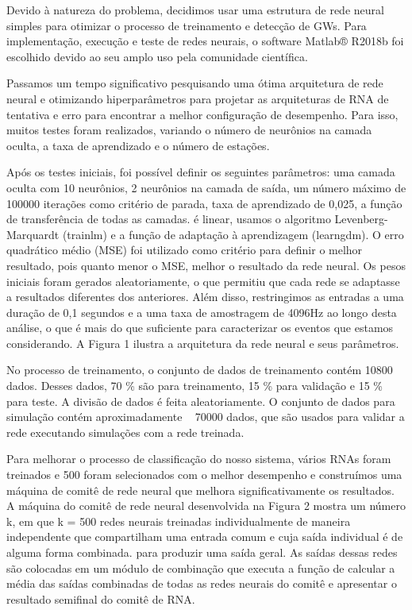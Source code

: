 Devido à natureza do problema, decidimos usar uma estrutura de rede neural simples para otimizar o processo de treinamento e detecção de GWs. Para implementação, execução e teste de redes neurais, o software Matlab® R2018b foi escolhido devido ao seu amplo uso pela comunidade científica.

Passamos um tempo significativo pesquisando uma ótima arquitetura de rede neural e otimizando hiperparâmetros para projetar as arquiteturas de RNA de tentativa e erro para encontrar a melhor configuração de desempenho. Para isso, muitos testes foram realizados, variando o número de neurônios na camada oculta, a taxa de aprendizado e o número de estações.

Após os testes iniciais, foi possível definir os seguintes parâmetros: uma camada oculta com 10 neurônios, 2 neurônios na camada de saída, um número máximo de 100000 iterações como critério de parada, taxa de aprendizado de 0,025, a função de transferência de todas as camadas. é linear, usamos o algoritmo Levenberg-Marquardt (trainlm) e a função de adaptação à aprendizagem (learngdm). O erro quadrático médio (MSE) foi utilizado como critério para definir o melhor resultado, pois quanto menor o MSE, melhor o resultado da rede neural. Os pesos iniciais foram gerados aleatoriamente, o que permitiu que cada rede se adaptasse a resultados diferentes dos anteriores. Além disso, restringimos as entradas a uma duração de 0,1 segundos e a uma taxa de amostragem de 4096Hz ao longo desta análise, o que é mais do que suficiente para caracterizar os eventos que estamos considerando. A Figura 1 ilustra a arquitetura da rede neural e seus parâmetros.

No processo de treinamento, o conjunto de dados de treinamento contém 10800 dados. Desses dados, 70 \% são para treinamento, 15 \% para validação e 15 \% para teste. A divisão de dados é feita aleatoriamente. O conjunto de dados para simulação contém aproximadamente ~ 70000 dados, que são usados ​​para validar a rede executando simulações com a rede treinada.

Para melhorar o processo de classificação do nosso sistema, vários RNAs foram treinados e 500 foram selecionados com o melhor desempenho e construímos uma máquina de comitê de rede neural que melhora significativamente os resultados. A máquina do comitê de rede neural desenvolvida na Figura 2 mostra um número k, em que k = 500 redes neurais treinadas individualmente de maneira independente que compartilham uma entrada comum e cuja saída individual é de alguma forma combinada. para produzir uma saída geral. As saídas dessas redes são colocadas em um módulo de combinação que executa a função de calcular a média das saídas combinadas de todas as redes neurais do comitê e apresentar o resultado semifinal do comitê de RNA.